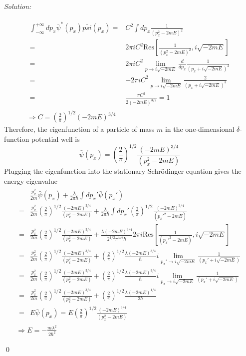 \documentclass[12pt,a4paper]{article}
\newenvironment{sol}
    {\emph{Solution:}
    }
    {
    \qed
    }
\begin{document}
\begin{sol}
\begin{gather}
\begin{align}
\nonumber\int_{-\infty}^{+\infty}dp_x\bar{\psi}^*(p_x)\bar{psi}(p_x)=&C^2\int dp_x\frac{1}{(p_x^2-2mE)^2}\\
\nonumber=&2\pi iC^2\text{Res}\left[\frac{1}{(p_x^2-2mE)^2},i\sqrt{-2mE}\right]\\
\nonumber=&2\pi iC^2\lim_{p\rightarrow i\sqrt{-2mE}}\frac{d}{dp_x}\frac{1}{(p_x+i\sqrt{-2mE})^2}\\
\nonumber=&-2\pi iC^2\lim_{p\rightarrow i\sqrt{-2mE}}\frac{2}{(p_x+i\sqrt{-2mE})^3}\\
=&\frac{\pi C^2}{2(-2mE)^{3/2}}=1
\end{align}\\
\Longrightarrow C=\left(\frac{2}{\pi}\right)^{1/2}(-2mE)^{3/4}
\end{gather}
Therefore, the eigenfunction of a particle of mass $m$ in the one-dimensional $\delta$-function potential well is
\begin{equation}
\bar{\psi}(p_x)=\left(\frac{2}{\pi}\right)^{1/2}\frac{(-2mE)^{3/4}}{(p_x^2-2mE)}
\end{equation}
Plugging the eigenfunction into the stationary Schrödinger equation gives the energy eigenvalue
\begin{gather}
\begin{align}
\nonumber&\frac{p_x^2}{2m}\bar{\psi}(p_x)+\frac{\lambda}{2\pi\hbar}\int dp_x'\bar{\psi}(p_x')\\
\nonumber=&\frac{p_x^2}{2m}\left(\frac{2}{\pi}\right)^{1/2}\frac{(-2mE)^{3/4}}{(p_x^2-2mE)}+\frac{\lambda}{2\pi\hbar}\int dp_x'\left(\frac{2}{\pi}\right)^{1/2}\frac{(-2mE)^{3/4}}{(p_x'^2-2mE)}\\
\nonumber=&\frac{p_x^2}{2m}\left(\frac{2}{\pi}\right)^{1/2}\frac{(-2mE)^{3/4}}{(p_x^2-2mE)}+\frac{\lambda(-2mE)^{3/4}}{2^{1/2}\pi^{3/2}\hbar}2\pi i\text{Res}\left[\frac{1}{(p_x'^2-2mE)},i\sqrt{-2mE}\right]\\
\nonumber=&\frac{p_x^2}{2m}\left(\frac{2}{\pi}\right)^{1/2}\frac{(-2mE)^{3/4}}{(p_x^2-2mE)}+\left(\frac{2}{\pi}\right)^{1/2}\frac{\lambda(-2mE)^{3/4}}{\hbar}i\lim_{p_x'\rightarrow i\sqrt{-2mE}}\frac{1}{(p_x'+i\sqrt{-2mE})}\\
\nonumber=&\frac{p_x^2}{2m}\left(\frac{2}{\pi}\right)^{1/2}\frac{(-2mE)^{3/4}}{(p_x^2-2mE)}+\left(\frac{2}{\pi}\right)^{1/2}\frac{\lambda(-2mE)^{3/4}}{\hbar}i\lim_{p_x\rightarrow i\sqrt{-2mE}}\frac{1}{(p_x'+i\sqrt{-2mE})}\\
\nonumber=&\frac{p_x^2}{2m}\left(\frac{2}{\pi}\right)^{1/2}\frac{(-2mE)^{3/4}}{(p_x^2-2mE)}+\left(\frac{2}{\pi}\right)^{1/2}\frac{\lambda(-2mE)^{1/4}}{2\hbar}\\
=&E\bar{\psi}(p_x)=E\left(\frac{2}{\pi}\right)^{1/2}\frac{(-2mE)^{3/4}}{(p_x^2-2mE)}
\end{align}\\
\Longrightarrow E=-\frac{m\lambda^2}{2\hbar^2}
\end{gather}
\end{sol}
\end{document}
